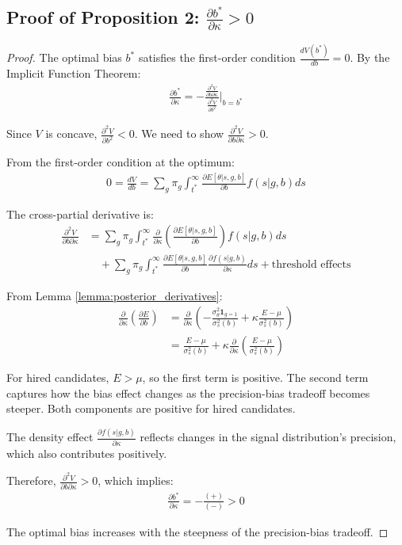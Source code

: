 \subsection{Proof of Proposition 2: $\frac{\partial b^*}{\partial \kappa} > 0$}

\begin{proof}
The optimal bias $b^*$ satisfies the first-order condition $\frac{dV(b^*)}{db} = 0$. By the Implicit Function Theorem:
\begin{align}
\frac{\partial b^*}{\partial \kappa} = -\frac{\frac{\partial^2 V}{\partial b \partial \kappa}}{\frac{\partial^2 V}{\partial b^2}}\bigg|_{b=b^*}
\end{align}

Since $V$ is concave, $\frac{\partial^2 V}{\partial b^2} < 0$. We need to show $\frac{\partial^2 V}{\partial b \partial \kappa} > 0$.

From the first-order condition at the optimum:
\begin{align}
0 = \frac{dV}{db} = \sum_{g} \pi_g \int_{t^*}^\infty \frac{\partial E[\theta|s,g,b]}{\partial b} f(s|g,b) ds
\end{align}

The cross-partial derivative is:
\begin{align}
\frac{\partial^2 V}{\partial b \partial \kappa} &= \sum_{g} \pi_g \int_{t^*}^\infty \frac{\partial}{\partial \kappa}\left(\frac{\partial E[\theta|s,g,b]}{\partial b}\right) f(s|g,b) ds \\
&\quad + \sum_{g} \pi_g \int_{t^*}^\infty \frac{\partial E[\theta|s,g,b]}{\partial b} \frac{\partial f(s|g,b)}{\partial \kappa} ds + \text{threshold effects}
\end{align}

From Lemma \ref{lemma:posterior_derivatives}:
\begin{align}
\frac{\partial}{\partial \kappa}\left(\frac{\partial E}{\partial b}\right) &= \frac{\partial}{\partial \kappa}\left(-\frac{\sigma_\theta^2 \mathbf{1}_{g=1}}{\sigma_s^2(b)} + \kappa \frac{E - \mu}{\sigma_s^2(b)}\right) \\
&= \frac{E - \mu}{\sigma_s^2(b)} + \kappa \frac{\partial}{\partial \kappa}\left(\frac{E - \mu}{\sigma_s^2(b)}\right)
\end{align}

For hired candidates, $E > \mu$, so the first term is positive. The second term captures how the bias effect changes as the precision-bias tradeoff becomes steeper. Both components are positive for hired candidates.

The density effect $\frac{\partial f(s|g,b)}{\partial \kappa}$ reflects changes in the signal distribution's precision, which also contributes positively.

Therefore, $\frac{\partial^2 V}{\partial b \partial \kappa} > 0$, which implies:
\begin{align}
\frac{\partial b^*}{\partial \kappa} = -\frac{(+)}{(-)} > 0
\end{align}

The optimal bias increases with the steepness of the precision-bias tradeoff.
\end{proof}

